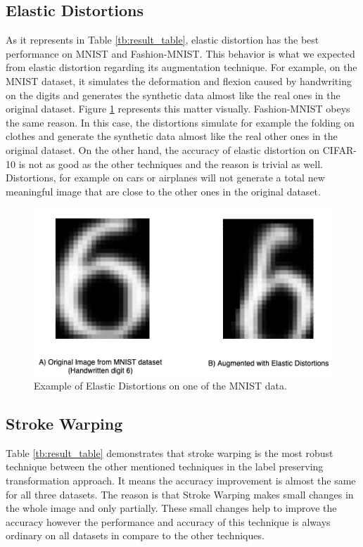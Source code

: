 \subsection{Elastic Distortions}
As it represents in Table \ref{tb:result_table}, elastic distortion has the best performance on
MNIST and Fashion-MNIST. This behavior is what we expected from elastic distortion regarding its
augmentation technique. For example, on the MNIST dataset, it simulates the deformation and flexion
caused by handwriting on the digits and generates the synthetic data almost like the real ones in
the original dataset. Figure \ref{fig:Elastic_Distortion_Example} represents this matter visually.
Fashion-MNIST obeys the same reason. In this case, the distortions simulate for example the folding
on clothes and generate the synthetic data almost like the real other ones in the original dataset.
On the other hand, the accuracy of elastic distortion on CIFAR-10 is not as good as the other
techniques and the reason is trivial as well. Distortions, for example on cars or airplanes will not
generate a total new meaningful image that are close to the other ones in the original
dataset.

\begin{figure}
  \centering
  \label{fig:Elastic_Distortion_Example}
  \includegraphics[width=1\textwidth]{fig/result/Elastic-Distortions-Example}
  \caption{Example of Elastic Distortions on one of the MNIST data.}
\end{figure}

\subsection{Stroke Warping}
Table \ref{tb:result_table} demonstrates that stroke warping is the most robust technique between
the other mentioned techniques in the label preserving transformation approach. It means the
accuracy improvement is almost the same for all three datasets. The reason is that Stroke Warping
makes small changes in the whole image and only partially. These small changes help to improve the
accuracy however the performance and accuracy of this technique is always ordinary on all datasets in compare to the
other techniques.


